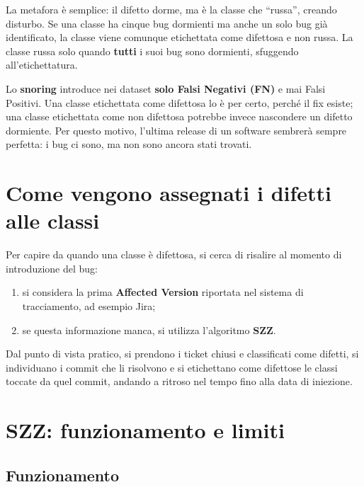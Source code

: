 \begin{notaprof}
La metafora è semplice: il difetto dorme, ma è la classe che ``russa'', creando disturbo. Se una classe ha cinque bug dormienti ma anche un solo bug già identificato, la classe viene comunque etichettata come difettosa e non russa. La classe russa solo quando \textbf{tutti} i suoi bug sono dormienti, sfuggendo all'etichettatura.
\end{notaprof}

\begin{notaesame}
Lo \textbf{snoring} introduce nei dataset \textbf{solo Falsi Negativi (FN)} e mai Falsi Positivi. Una classe etichettata come difettosa lo è per certo, perché il fix esiste; una classe etichettata come non difettosa potrebbe invece nascondere un difetto dormiente. Per questo motivo, l'ultima release di un software sembrerà sempre perfetta: i bug ci sono, ma non sono ancora stati trovati.
\end{notaesame}

\section{Come vengono assegnati i difetti alle classi}

Per capire da quando una classe è difettosa, si cerca di risalire al momento di introduzione del bug:

\begin{enumerate}
    \item si considera la prima \textbf{Affected Version} riportata nel sistema di tracciamento, ad esempio Jira;
    \item se questa informazione manca, si utilizza l'algoritmo \textbf{SZZ}.
\end{enumerate}

\begin{notaprof}
Dal punto di vista pratico, si prendono i ticket chiusi e classificati come difetti, si individuano i commit che li risolvono e si etichettano come difettose le classi toccate da quel commit, andando a ritroso nel tempo fino alla data di iniezione.
\end{notaprof}

\section{SZZ: funzionamento e limiti}

\subsection{Funzionamento}

